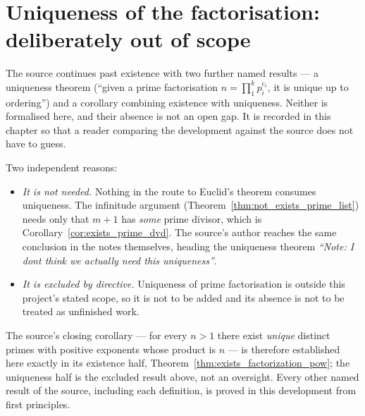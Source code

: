\section{Uniqueness of the factorisation: deliberately out of scope}
\label{sec:uniqueness_out_of_scope}

The source continues past existence with two further named results --- a
uniqueness theorem (``given a prime factorisation $n = \prod_1^k p_i^{e_i}$, it
is unique up to ordering'') and a corollary combining existence with uniqueness.
Neither is formalised here, and their absence is not an open gap. It is recorded
in this chapter so that a reader comparing the development against the source
does not have to guess.

Two independent reasons:

\begin{itemize}
  \item \emph{It is not needed.} Nothing in the route to Euclid's theorem
    consumes uniqueness. The infinitude argument
    (Theorem~\ref{thm:not_exists_prime_list}) needs only that $m + 1$ has
    \emph{some} prime divisor, which is
    Corollary~\ref{cor:exists_prime_dvd}. The source's author reaches the same
    conclusion in the notes themselves, heading the uniqueness theorem
    \textit{``Note: I dont think we actually need this uniqueness''}.
  \item \emph{It is excluded by directive.} Uniqueness of prime factorisation is
    outside this project's stated scope, so it is not to be added and its absence
    is not to be treated as unfinished work.
\end{itemize}

The source's closing corollary --- for every $n > 1$ there exist \emph{unique}
distinct primes with positive exponents whose product is $n$ --- is therefore
established here exactly in its existence half,
Theorem~\ref{thm:exists_factorization_pow}; the uniqueness half is the excluded
result above, not an oversight. Every other named result of the source, including
each definition, is proved in this development from first principles.
